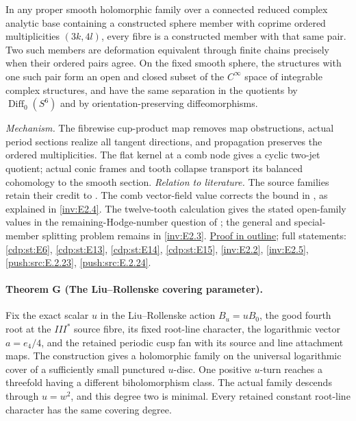 In any proper smooth holomorphic family over a connected reduced
complex analytic base containing a constructed sphere member with
coprime ordered multiplicities $(3k,4l)$, every fibre is a
constructed member with that same pair. Two such members are
deformation equivalent through finite chains precisely when their
ordered pairs agree. On the fixed smooth sphere, the structures
with one such pair form an open and closed subset of the
$C^\infty$ space of integrable complex structures, and have the
same separation in the quotients by $\operatorname{Diff}_0(S^6)$
and by orientation-preserving diffeomorphisms.

\textit{Mechanism.} The fibrewise cup-product map removes map
obstructions, actual period sections realize all tangent
directions, and propagation preserves the ordered multiplicities.
The flat kernel at a comb node gives a cyclic two-jet quotient;
actual conic frames and tooth collapse transport its balanced
cohomology to the smooth section.
\textit{Relation to literature.} The source families retain their
credit to \cite{Viaclovsky2026Two,LiuRollenske2026,Viaclovsky2026Combs}.
The comb vector-field value corrects the bound in
\cite[Corollary~1.3, p.~2]{HKP2000}, as explained in
\ref{inv:E2.4}.
The twelve-tooth calculation gives the stated open-family values
in the remaining-Hodge-number question of
\cite[Section~10(2)]{Viaclovsky2026Combs}; the general and
special-member splitting problem remains in \ref{inv:E2.3}.
\hyperlink{outline-II-F}{Proof in outline}; full statements:
\ref{cdp:st:E6}, \ref{cdp:st:E13}, \ref{cdp:st:E14},
\ref{cdp:st:E15}, \ref{inv:E2.2}, \ref{inv:E2.5},
\ref{push:src:E.2.23}, \ref{push:src:E.2.24}.

\hypertarget{main-II-G}{}
\paragraph{Theorem G (The Liu--Rollenske covering parameter).}
\label{series:II:G}
Fix the exact scalar $u$ in the Liu--Rollenske action $B_u=uB_0$,
the good fourth root at the $III^*$ source fibre, its fixed
root-line character, the logarithmic vector $a=e_4/4$, and the
retained periodic cusp fan with its source and line attachment
maps. The construction gives a holomorphic family on the universal
logarithmic cover of a sufficiently small punctured $u$-disc.
One positive $u$-turn reaches a threefold having a different
biholomorphism class. The actual family descends through
$u=w^2$, and this degree two is minimal. Every retained constant
root-line character has the same covering degree.

